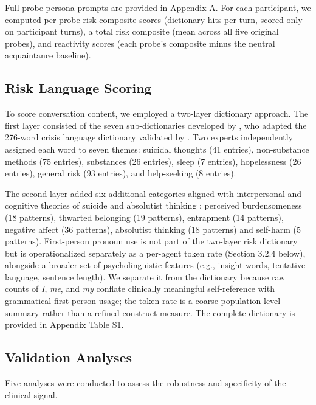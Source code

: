 \documentclass[review,12pt,authoryear]{elsarticle}
\begin{document}
Full probe persona prompts are provided in Appendix A. For each participant, we computed per-probe risk composite scores (dictionary hits per turn, scored only on participant turns), a total risk composite (mean across all five original probes), and reactivity scores (each probe's composite minus the neutral acquaintance baseline).

\subsection{Risk Language Scoring}

To score conversation content, we employed a two-layer dictionary approach. The first layer consisted of the seven sub-dictionaries developed by \citet{ammerman2026dictionary}, who adapted the 276-word crisis language dictionary validated by \citet{swaminathan2023nlp}. Two experts independently assigned each word to seven themes: suicidal thoughts (41 entries), non-substance methods (75 entries), substances (26 entries), sleep (7 entries), hopelessness (26 entries), general risk (93 entries), and help-seeking (8 entries).

The second layer added six additional categories aligned with interpersonal and cognitive theories of suicide \citep{oconnor2011integrated} and absolutist thinking \citep{almosaiwi2018absolute}: perceived burdensomeness (18 patterns), thwarted belonging (19 patterns), entrapment (14 patterns), negative affect (36 patterns), absolutist thinking (18 patterns) and self-harm (5 patterns). First-person pronoun use \citep{stirman2001word} is not part of the two-layer risk dictionary but is operationalized separately as a per-agent token rate (Section 3.2.4 below), alongside a broader set of psycholinguistic features (e.g., insight words, tentative language, sentence length). We separate it from the dictionary because raw counts of \textit{I}, \textit{me}, and \textit{my} conflate clinically meaningful self-reference with grammatical first-person usage; the token-rate is a coarse population-level summary rather than a refined construct measure. The complete dictionary is provided in Appendix Table S1.

\subsection{Validation Analyses}

Five analyses were conducted to assess the robustness and specificity of the clinical signal.
\end{document}
